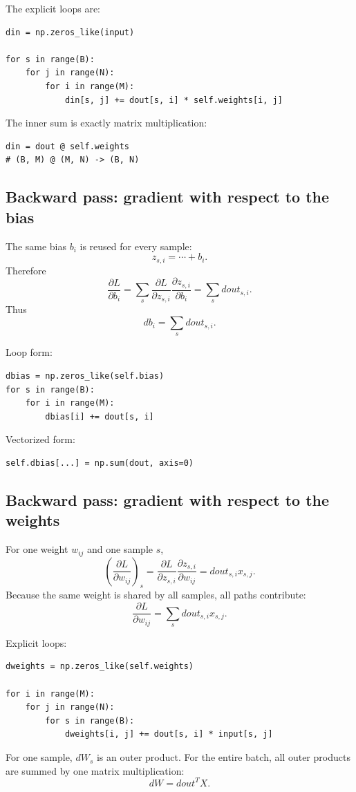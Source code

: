 \documentclass[11pt,a4paper]{article}
\newcommand{\pd}[2]{\frac{\partial #1}{\partial #2}}
\begin{document}
The explicit loops are:
\begin{lstlisting}
din = np.zeros_like(input)

for s in range(B):
    for j in range(N):
        for i in range(M):
            din[s, j] += dout[s, i] * self.weights[i, j]
\end{lstlisting}

The inner sum is exactly matrix multiplication:
\begin{lstlisting}
din = dout @ self.weights
# (B, M) @ (M, N) -> (B, N)
\end{lstlisting}

\subsection{Backward pass: gradient with respect to the bias}

The same bias $b_i$ is reused for every sample:
\[
z_{s,i}=\cdots+b_i.
\]
Therefore
\[
\pd{L}{b_i}
=
\sum_s
\pd{L}{z_{s,i}}
\pd{z_{s,i}}{b_i}
=
\sum_s dout_{s,i}.
\]
Thus
\[
\boxed{db_i=\sum_s dout_{s,i}}.
\]

Loop form:
\begin{lstlisting}
dbias = np.zeros_like(self.bias)
for s in range(B):
    for i in range(M):
        dbias[i] += dout[s, i]
\end{lstlisting}

Vectorized form:
\begin{lstlisting}
self.dbias[...] = np.sum(dout, axis=0)
\end{lstlisting}

\subsection{Backward pass: gradient with respect to the weights}

For one weight $w_{ij}$ and one sample $s$,
\[
\left(\pd{L}{w_{ij}}\right)_s
=
\pd{L}{z_{s,i}}
\pd{z_{s,i}}{w_{ij}}
=
dout_{s,i}x_{s,j}.
\]
Because the same weight is shared by all samples, all paths contribute:
\[
\boxed{
\pd{L}{w_{ij}}=\sum_s dout_{s,i}x_{s,j}
}.
\]

Explicit loops:
\begin{lstlisting}
dweights = np.zeros_like(self.weights)

for i in range(M):
    for j in range(N):
        for s in range(B):
            dweights[i, j] += dout[s, i] * input[s, j]
\end{lstlisting}

For one sample, $dW_s$ is an outer product. For the entire batch, all outer products are summed by one matrix multiplication:
\[
\boxed{dW=dout^T X}.
\]
\end{document}
